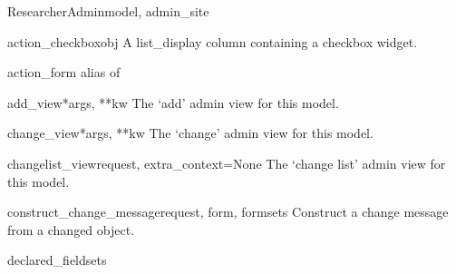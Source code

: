 \documentclass[letterpaper,10pt,english]{sphinxmanual}
\begin{document}
\hypertarget{data.admin.ResearcherAdmin}{}\begin{classdesc}{ResearcherAdmin}{model, admin\_site}~

\hypertarget{data.admin.ResearcherAdmin.action_checkbox}{}\begin{methoddesc}{action\_checkbox}{obj}
A list\_display column containing a checkbox widget.
\end{methoddesc}

\hypertarget{data.admin.ResearcherAdmin.action_form}{}\begin{memberdesc}{action\_form}
alias of 
\end{memberdesc}

\hypertarget{data.admin.ResearcherAdmin.add_view}{}\begin{methoddesc}{add\_view}{*args, **kw}
The `add' admin view for this model.
\end{methoddesc}

\hypertarget{data.admin.ResearcherAdmin.change_view}{}\begin{methoddesc}{change\_view}{*args, **kw}
The `change' admin view for this model.
\end{methoddesc}

\hypertarget{data.admin.ResearcherAdmin.changelist_view}{}\begin{methoddesc}{changelist\_view}{request, extra\_context=None}
The `change list' admin view for this model.
\end{methoddesc}

\hypertarget{data.admin.ResearcherAdmin.construct_change_message}{}\begin{methoddesc}{construct\_change\_message}{request, form, formsets}
Construct a change message from a changed object.
\end{methoddesc}

\hypertarget{data.admin.ResearcherAdmin.declared_fieldsets}{}\begin{memberdesc}{declared\_fieldsets}\end{memberdesc}


\end{classdesc}
\end{document}
